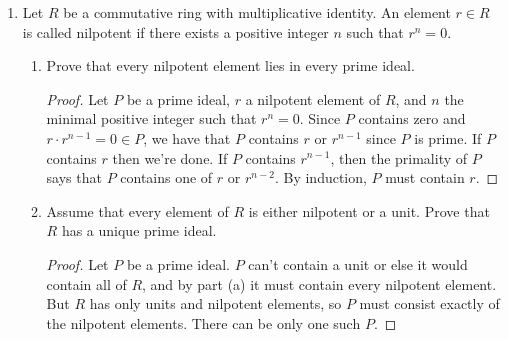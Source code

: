 \documentclass[11pt,letterpaper]{report}
\begin{document}
\begin{enumerate}
	\item Let $R$ be a commutative ring with multiplicative identity. An element $r\in R$ is called nilpotent if there exists a positive integer $n$ such that $r^n = 0$.
	\begin{enumerate}
		\item Prove that every nilpotent element lies in every prime ideal.
		\begin{proof}
			Let $P$ be a prime ideal, $r$ a nilpotent element of $R$, and $n$ the minimal positive integer such that $r^n = 0$. Since $P$ contains zero and $r\cdot r^{n-1} = 0\in P$, we have that $P$ contains $r$ or $r^{n-1}$ since $P$ is prime. If $P$ contains $r$ then we're done. If $P$ contains $r^{n-1}$, then the primality of $P$ says that $P$ contains one of $r$ or $r^{n-2}$. By induction, $P$ must contain $r$.
		\end{proof}
		\item Assume that every element of $R$ is either nilpotent or a unit. Prove that $R$ has a unique prime ideal.
		\begin{proof}
			Let $P$ be a prime ideal. $P$ can't contain a unit or else it would contain all of $R$, and by part (a) it must contain every nilpotent element. But $R$ has only units and nilpotent elements, so $P$ must consist exactly of the nilpotent elements. There can be only one such $P$.
		\end{proof}
	\end{enumerate}


\end{enumerate}
\end{document}
